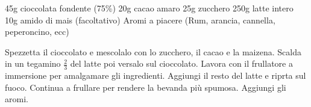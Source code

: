 \begin{ingreds}
	45g cioccolata fondente (75\%) 
	20g cacao amaro 
	25g zucchero
	250g latte intero 
	10g amido di mais (facoltativo) 
	Aromi a piacere (Rum, arancia, cannella, peperoncino, ecc)

\end{ingreds}

\begin{method}
Spezzetta il cioccolato e mescolalo con lo zucchero, il cacao e la maizena. Scalda in un tegamino $\frac{2}{3}$ del latte poi versalo sul cioccolato. Lavora con il frullatore a immersione per amalgamare gli ingredienti. Aggiungi il resto del latte e riprta sul fuoco. Continua a frullare per rendere la bevanda più spumosa. Aggiungi gli aromi.
\end{method}



